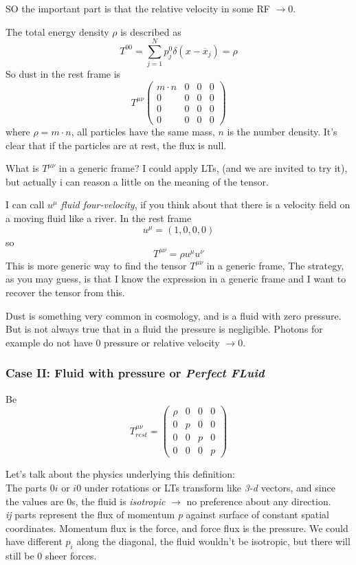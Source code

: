 SO the important part is that the relative velocity in some RF $\to 0$.

The total energy density $\rho $ is described as 
\[
	T^{00} = \sum_{j = 1}^{N}{p^{0}_{j} \delta\left( x- \overline{x}_{j} \right)} = \rho 
\]
So dust in the rest frame is 
\begin{equation}
T^{\mu \nu }\begin{pmatrix}
m\cdot n & 0 & 0 & 0 \\
0 & 0 & 0 & 0 \\
0 & 0 & 0 & 0 \\
0 & 0 & 0 & 0
\end{pmatrix} 
\end{equation}
where $\rho = m\cdot n$, all particles have the same mass, $n$ is the number density. It's clear that if the particles are at rest, the flux is null.

What is $T^{\mu \nu }$ in a generic frame? I could apply LTs, (and we are invited to try it), but actually i can reason a little on the meaning of the tensor.

I can call $u^{\mu }$ \emph{fluid four-velocity}, if you think about that there is a velocity field on a moving fluid like a river. In the rest frame
\[
u^{\mu }= \left( 1,0,0,0 \right)
\]
so 
\[
T^{\mu \nu } = \rho u^{\mu }u^{\nu }
\]
This is more generic way to find the tensor $T^{\mu \nu }$ in a generic frame, The strategy, as you may guess, is that I know the expression in a generic frame and I want to recover the tensor from this.

Dust is something very common in cosmology, and is a fluid with zero pressure. But is not always true that in a fluid the pressure is negligible. Photons for example do not have 0 pressure or relative velocity $\to 0$.

\subsubsection{Case II: Fluid with pressure or \emph{Perfect FLuid} }

Be
\begin{equation}
T^{\mu \nu }_{rest} = \begin{pmatrix}
\rho  & 0 & 0 & 0 \\
0 & p & 0 & 0 \\
0 & 0 & p & 0 \\
0 & 0 & 0 & p
\end{pmatrix} 
\end{equation}

Let's talk about the physics underlying this definition: \\
The parts $0i$ or $i0$ under rotations or LTs transform like \emph{3-d} vectors, and since the values are 0s, the fluid is \emph{isotropic} $\to $ no preference about any direction.\\
\emph{ij} parts represent the flux of momentum \emph{p} against surface of constant spatial coordinates. Momentum flux is the force, and force flux is the pressure. We could have different $p_{i}$ along the diagonal, the fluid wouldn't be isotropic, but there will still be 0 sheer forces.

